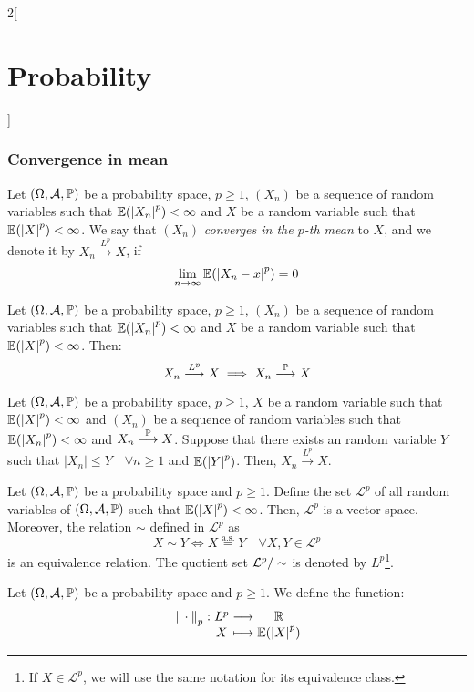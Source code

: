 \documentclass[../../../main.tex]{subfiles}
\begin{document}
\begin{multicols}{2}[\section{Probability}]
    \subsubsection{Convergence in mean}
    \begin{definition}
        Let $(\Omega,\mathcal{A},\mathbb{P})$ be a probability space, $p\geq 1$, $(X_n)$ be a sequence of random variables such that $\mathbb{E}({|X_n|}^p)<\infty$ and $X$ be a random variable such that $\mathbb{E}({|X|}^p)<\infty$. We say that $(X_n)$ \textit{converges in the $p$-th mean} to $X$, and we denote it by $X_n\overset{L^p}{\longrightarrow} X$, if  $$\lim_{n\to\infty}\mathbb{E}({|X_n-x|}^p)=0$$
    \end{definition}
    \begin{prop}
        Let $(\Omega,\mathcal{A},\mathbb{P})$ be a probability space, $p\geq 1$, $(X_n)$ be a sequence of random variables such that $\mathbb{E}({|X_n|}^p)<\infty$ and $X$ be a random variable such that $\mathbb{E}({|X|}^p)<\infty$. Then:
        $$X_n\overset{L^p}{\longrightarrow} X\implies X_n\overset{\mathbb{P}}{\longrightarrow} X$$
    \end{prop}
    \begin{theorem}
        Let $(\Omega,\mathcal{A},\mathbb{P})$ be a probability space, $p\geq 1$, $X$ be a random variable such that $\mathbb{E}({|X|}^p)<\infty$ and $(X_n)$ be a sequence of random variables such that $\mathbb{E}({|X_n|}^p)<\infty$ and $X_n\overset{\mathbb{P}}{\longrightarrow}X$. Suppose that there exists an random variable $Y$ such that $|X_n|\leq Y\quad\forall n\geq 1$ and $\mathbb{E}({|Y|}^p)$. Then, $X_n\overset{L^p}{\longrightarrow} X$.
    \end{theorem}
    \begin{lemma}
        Let $(\Omega,\mathcal{A},\mathbb{P})$ be a probability space and $p\geq 1$. Define the set $\mathcal{L}^p$ of all random variables of $(\Omega,\mathcal{A},\mathbb{P})$ such that $\mathbb{E}({|X|}^p)<\infty$. Then, $\mathcal{L}^p$ is a vector space. Moreover, the relation $\sim$ defined in $\mathcal{L}^p$ as $$X\sim Y\iff X\overset{\text{a.s.}}{=} Y\quad\forall X,Y\in\mathcal{L}^p$$ is an equivalence relation. The quotient set $\quot{\mathcal{L}^p}{\sim}$ is denoted by $L^p$\footnote{If $X\in\mathcal{L}^p$, we will use the same notation for its equivalence class.}.
    \end{lemma}
    \begin{prop}
        Let $(\Omega,\mathcal{A},\mathbb{P})$ be a probability space and $p\geq 1$. We define the function:
        $$
            \function{{\|\cdot\|}_p}{L^p}{\RR}{X}{\Exp({|X|}^p)}
$$
\end{prop}
\end{multicols}
\end{document}
